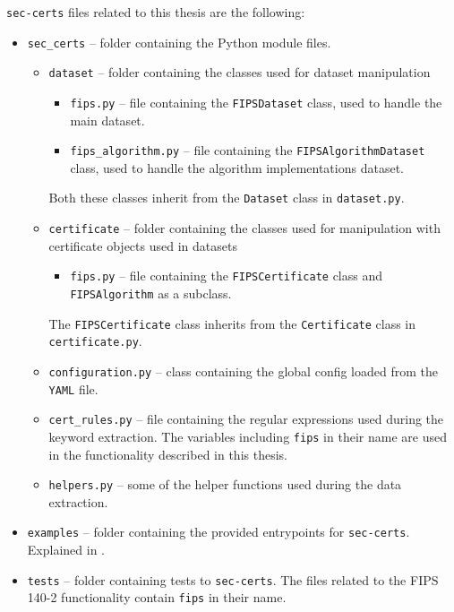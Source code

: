 \texttt{sec-certs} files related to this thesis are the following:
\begin{itemize}
    \item \texttt{sec\_certs} -- folder containing the Python module files.
    \begin{itemize}
        \item \texttt{dataset} -- folder containing the classes used for dataset manipulation
            \begin{itemize}
                \item \texttt{fips.py} -- file containing the \texttt{FIPSDataset} class, used to handle the main dataset.
                \item \texttt{fips\_algorithm.py} -- file containing the \texttt{FIPSAlgorithmDataset} class, used to handle the algorithm implementations dataset.
            \end{itemize}
            Both these classes inherit from the \texttt{Dataset} class in \texttt{dataset.py}.
        \item \texttt{certificate} -- folder containing the classes used for manipulation with certificate objects used in datasets
            \begin{itemize}
                \item \texttt{fips.py} -- file containing the \texttt{FIPSCertificate} class and \texttt{FIPSAlgorithm} as a subclass.
            \end{itemize}
            The \texttt{FIPSCertificate} class inherits from the \texttt{Certificate} class in \texttt{certificate.py}.
        \item \texttt{configuration.py} -- class containing the global config loaded from the \texttt{YAML} file.
        \item \texttt{cert\_rules.py} -- file containing the regular expressions used during the keyword extraction. The variables including \texttt{fips} in their name are used in the functionality described in this thesis.
        \item \texttt{helpers.py} -- some of the helper functions used during the data extraction.
    \end{itemize}
    \item \texttt{examples} -- folder containing the provided entrypoints for \texttt{sec-certs}. Explained in .
    \item \texttt{tests} -- folder containing tests to \texttt{sec-certs}. The files related to the FIPS 140-2 functionality contain \texttt{fips} in their name.
\end{itemize}

